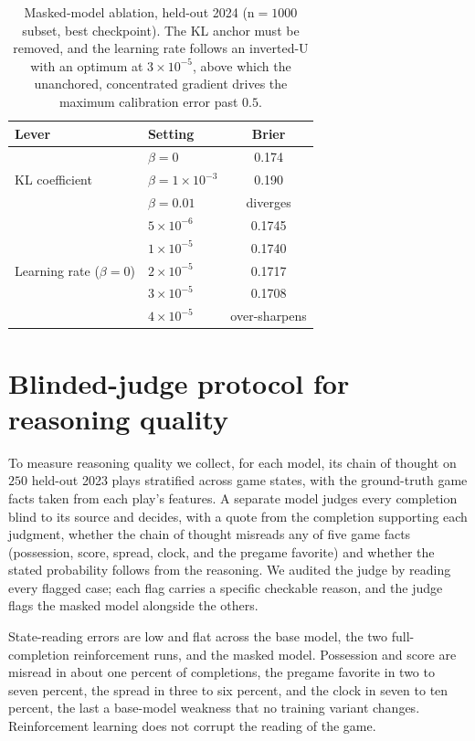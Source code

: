 \begin{table}[h]
\centering
\small
\begin{tabular}{llc}
\toprule
Lever & Setting & Brier \\
\midrule
\multirow{3}{*}{KL coefficient} & $\beta=0$ & 0.174 \\
                                & $\beta=1\times10^{-3}$ & 0.190 \\
                                & $\beta=0.01$ & diverges \\
\midrule
\multirow{5}{*}{Learning rate ($\beta=0$)} & $5\times10^{-6}$ & 0.1745 \\
                                           & $1\times10^{-5}$ & 0.1740 \\
                                           & $2\times10^{-5}$ & 0.1717 \\
                                           & $3\times10^{-5}$ & 0.1708 \\
                                           & $4\times10^{-5}$ & over-sharpens \\
\bottomrule
\end{tabular}
\caption{Masked-model ablation, held-out 2024 (n${=}1000$ subset, best checkpoint). The KL anchor
must be removed, and the learning rate follows an inverted-U with an optimum at $3\times10^{-5}$,
above which the unanchored, concentrated gradient drives the maximum calibration error past $0.5$.}
\label{tab:masked-sweep}
\end{table}

\section{Blinded-judge protocol for reasoning quality}
\label{app:judge}

To measure reasoning quality we collect, for each model, its chain of thought on $250$ held-out 2023
plays stratified across game states, with the ground-truth game facts taken from each play's
features. A separate model judges every completion blind to its source and decides, with a quote
from the completion supporting each judgment, whether the chain of thought misreads any of five game
facts (possession, score, spread, clock, and the pregame favorite) and whether the stated
probability follows from the reasoning. We audited the judge by reading every flagged case; each
flag carries a specific checkable reason, and the judge flags the masked model alongside the others.

State-reading errors are low and flat across the base model, the two full-completion reinforcement
runs, and the masked model. Possession and score are misread in about one percent of completions,
the pregame favorite in two to seven percent, the spread in three to six percent, and the clock in
seven to ten percent, the last a base-model weakness that no training variant changes. Reinforcement
learning does not corrupt the reading of the game.

